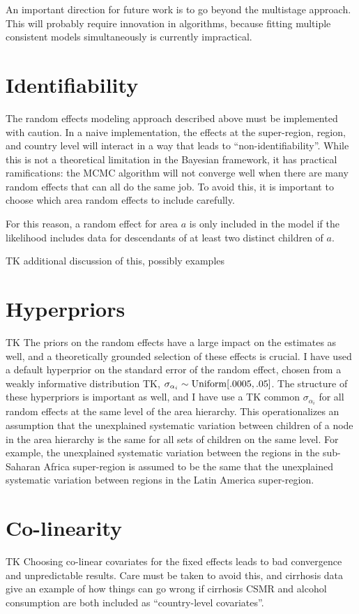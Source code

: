 An important direction for future work is to go beyond the multistage
approach.  This will probably require innovation in algorithms,
because fitting multiple consistent models simultaneously is currently
impractical.

\section{Identifiability}
The random effects modeling approach described above must be
implemented with caution.  In a naive implementation, the effects at
the super-region, region, and country level will interact in a way
that leads to ``non-identifiability''.  While this is not a
theoretical limitation in the Bayesian framework, it has practical
ramifications: the MCMC algorithm will not converge well when there
are many random effects that can all do the same job.  To avoid this,
it is important to choose which area random effects to include
carefully.

For this reason, a random effect for area $a$ is only included in the
model if the likelihood includes data for descendants of at least two
distinct children of $a$.

TK additional discussion of this, possibly examples

\section{Hyperpriors}
TK The priors on the random effects have a large impact on the
estimates as well, and a theoretically grounded selection of these
effects is crucial.  I have used a default hyperprior on the standard
error of the random effect, chosen from a weakly informative
distribution TK, $\sigma_{\alpha_i} \sim \operatorname{Uniform}[.0005, .05]$.  The
structure of these hyperpriors is important as well, and I have use a
TK common $\sigma_{\alpha_i}$ for all random effects at the same level
of the area hierarchy.  This operationalizes an assumption that the
unexplained systematic variation between children of a node in the
area hierarchy is the same for all sets of children on the same level.
For example, the unexplained systematic variation between the regions
in the sub-Saharan Africa super-region is assumed to be the same that
the unexplained systematic variation between regions in the Latin
America super-region.

\section{Co-linearity}
TK Choosing co-linear covariates for the fixed effects leads to bad
convergence and unpredictable results.  Care must be taken to avoid
this, and cirrhosis data give an example of how things can go wrong if
cirrhosis CSMR and alcohol consumption are both included as
``country-level covariates''.

